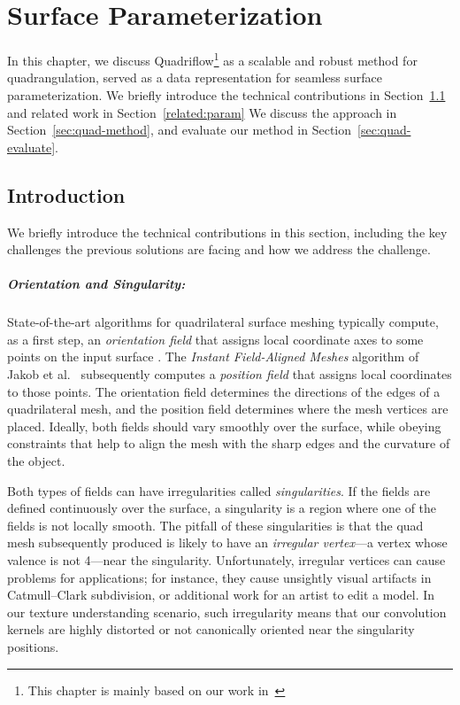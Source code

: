 \chapter{Surface Parameterization}
\label{chapter:param}
In this chapter, we discuss Quadriflow\footnote{This chapter is mainly based on our work in~\cite{huang2018quadriflow}} as a scalable and robust method for quadrangulation, served as a data representation for seamless surface parameterization.
%
We briefly introduce the technical contributions in Section~\ref{sec:param-intro} and related work in Section~\ref{related:param}
%
We discuss the approach in Section~\ref{sec:quad-method}, and evaluate our method in Section~\ref{sec:quad-evaluate}.

\section{Introduction}
\label{sec:param-intro}
We briefly introduce the technical contributions in this section, including the key challenges the previous solutions are facing and how we address the challenge.

\paragraph*{Orientation and Singularity:} State-of-the-art algorithms for quadrilateral surface meshing typically compute, as a first step, an \emph{orientation field} that assigns local coordinate axes to some points on the input surface \cite{knupp1995mesh,ray2006periodic,kalberer2007quadcover,bommes2009mixed}. The {\em Instant Field-Aligned Meshes} \mbox{algorithm} of Jakob et al.~\cite{jakob2015instant} subsequently computes a \emph{position field} that assigns local coordinates %
to those points. The orientation field determines the directions of the edges of a quadrilateral mesh, and the position field determines where the mesh vertices are placed. Ideally, both fields should vary smoothly over the surface, while obeying constraints that help to align the mesh with the sharp edges and the curvature of the object.

Both types of fields can have irregularities called \emph{singularities}. If the fields are defined continuously over the surface, a singularity is a region where one of the fields is not locally smooth.
The pitfall of these singularities is that the quad mesh subsequently produced is likely to have an \emph{irregular vertex}---a vertex whose valence is not 4---near the singularity. 
Unfortunately, irregular vertices can cause problems for applications; for instance, they cause unsightly visual artifacts in Catmull--Clark subdivision, or additional work for an artist to edit a model. In our texture understanding scenario, such irregularity means that our convolution kernels are highly distorted or not canonically oriented near the singularity positions.

